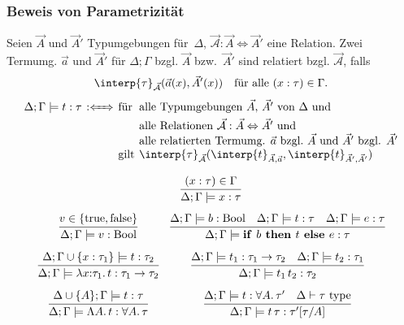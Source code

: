 \documentclass{beamer}
\newcommand{\defiff}{:\xLeftrightarrow{\quad}} %
\newcommand{\IsType}[1]{{#1}\,\,\text{type}}
\newcommand{\Bool}{\text{Bool}}
\newcommand{\trueV}{\text{true}}
\newcommand{\falseV}{\text{false}}
\newcommand{\fa}[1]{\forall {#1}.\,}
\newcommand{\lam}[1]{\lambda #1.\,}
\newcommand{\Lam}[1]{\Lambda #1.\,}
\newcommand{\ite}[3]{\text{\textbf{if }} #1 \text{\textbf{ then }} #2 \text{\textbf{ else }} #3}
\newcommand{\termInterp}[3]{\interp{#3}_{#1, #2}}
\newcommand{\relInterp}[2]{\interp{#2}_{#1}}
\newcommand{\Rel}[3]{#1 : #2 \Leftrightarrow #3}
\renewcommand{\emph}[1]{\textcolor{Emph}{#1}}
\newtheorem*{satz}{Satz}
\begin{document}
\begin{frame}
  \frametitle{Beweis von Parametrizität}

  Seien $\vec{A}$ und $\vec{A}'$ Typumgebungen für~$\Delta$, $\Rel{\vec{\mathcal{A}}}{\vec{A}}{\vec{A}'}$ eine Relation.
  Zwei Termumg. $\vec{a}$ und $\vec{A}'$ für $\Delta; \Gamma$ bzgl. $\vec{A}$ bzw.~$\vec{A}'$ sind \emph{relatiert} bzgl. $\vec{\mathcal{A}}$, falls
  \[
    \relInterp{\vec{\mathcal{A}}}{\tau}(\vec{a}(x), \vec{A}'(x))
    \quad \text{für alle $(x : \tau) \in \Gamma$}.
  \]
  \[
    \arraycolsep=2pt
    \begin{array}{r c l l}
    \Delta; \Gamma \models t : \tau &\defiff
    &\text{für}& \text{alle Typumgebungen $\vec{A}$, $\vec{A}'$ von~$\Delta$ und} \\
    &&& \text{alle Relationen $\Rel{\vec{\mathcal{A}}}{\vec{A}}{\vec{A}'}$ und} \\
    &&& \text{alle relatierten Termumg. $\vec{a}$ bzgl.~$\vec{A}$ und $\vec{A}'$ bzgl. $\vec{A}'$} \\
    &&\text{gilt}& \relInterp{\vec{\mathcal{A}}}{\tau}(\termInterp{\vec{A}}{\vec{a}}{t}, \termInterp{\vec{A}'}{\vec{A}'}{t})
  \end{array}
  \]


\end{frame}

\begin{frame}
  \[
    \infer{
      \Delta; \Gamma \models x : \tau
    }{
      (x : \tau) \in \Gamma
    }
  \]
  \[\begin{array}{c c}
    \infer{
      \Delta; \Gamma \models v : \Bool
    }{
      v \in \{ \trueV, \falseV \}
    } &
    \infer{
      \Delta; \Gamma \models \ite{b}{t}{e} : \tau
    }{
      \Delta; \Gamma \models b : \Bool \quad
      \Delta; \Gamma \models t : \tau \quad
      \Delta; \Gamma \models e : \tau
    } \\[0.3cm]
    \infer{
      \Delta; \Gamma \models \lam{x{:}\tau_1} t : \tau_1 \to \tau_2
    }{
      \Delta; \Gamma \cup \{ x : \tau_1 \} \models t : \tau_2
    } &
    \infer{
      \Delta; \Gamma \models t_1\,t_2 : \tau_2
    }{
      \Delta; \Gamma \models t_1 : \tau_1 \to \tau_2 \quad
      \Delta; \Gamma \models t_2 : \tau_1
    } \\[0.3cm]
    \infer{
      \Delta; \Gamma \models \Lam{A} t : \fa{A} \tau
    }{
      \Delta \cup \{ A \}; \Gamma \models t : \tau
    } &
    \infer{
      \Delta; \Gamma \models t\,\tau : \tau'[\tau/A]
    }{
      \Delta; \Gamma \models t : \fa{A} \tau' \quad
      \Delta \vdash \IsType{\tau}
    }
  \end{array}\]
\end{frame}
\end{document}
